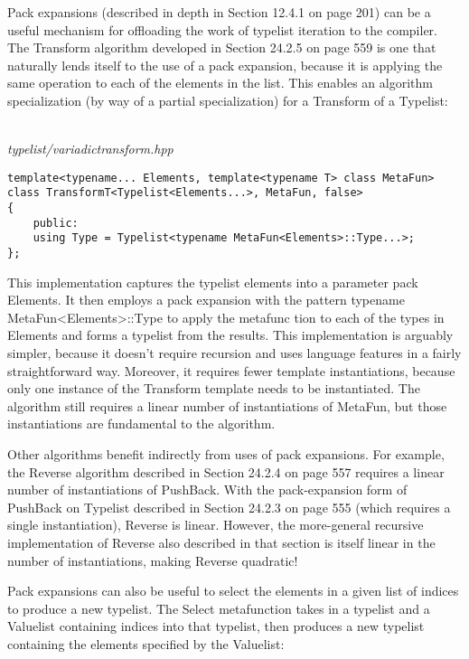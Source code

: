 Pack expansions (described in depth in Section 12.4.1 on page 201) can be a useful mechanism for offloading the work of typelist iteration to the compiler. The Transform algorithm developed in Section 24.2.5 on page 559 is one that naturally lends itself to the use of a pack expansion, because it is applying the same operation to each of the elements in the list. This enables an algorithm specialization (by way of a partial specialization) for a Transform of a Typelist:

\hspace*{\fill} \\ %
\noindent
\textit{typelist/variadictransform.hpp}
\begin{lstlisting}[style=styleCXX]
template<typename... Elements, template<typename T> class MetaFun>
class TransformT<Typelist<Elements...>, MetaFun, false>
{
	public:
	using Type = Typelist<typename MetaFun<Elements>::Type...>;
};
\end{lstlisting}

This implementation captures the typelist elements into a parameter pack Elements. It then employs a pack expansion with the pattern typename MetaFun<Elements>::Type to apply the metafunc tion to each of the types in Elements and forms a typelist from the results. This implementation is arguably simpler, because it doesn’t require recursion and uses language features in a fairly straightforward way. Moreover, it requires fewer template instantiations, because only one instance of the Transform template needs to be instantiated. The algorithm still requires a linear number of instantiations of MetaFun, but those instantiations are fundamental to the algorithm.

Other algorithms benefit indirectly from uses of pack expansions. For example, the Reverse algorithm described in Section 24.2.4 on page 557 requires a linear number of instantiations of PushBack. With the pack-expansion form of PushBack on Typelist described in Section 24.2.3 on page 555 (which requires a single instantiation), Reverse is linear. However, the more-general recursive implementation of Reverse also described in that section is itself linear in the number of instantiations, making Reverse quadratic!

Pack expansions can also be useful to select the elements in a given list of indices to produce a new typelist. The Select metafunction takes in a typelist and a Valuelist containing indices into that typelist, then produces a new typelist containing the elements specified by the Valuelist:

